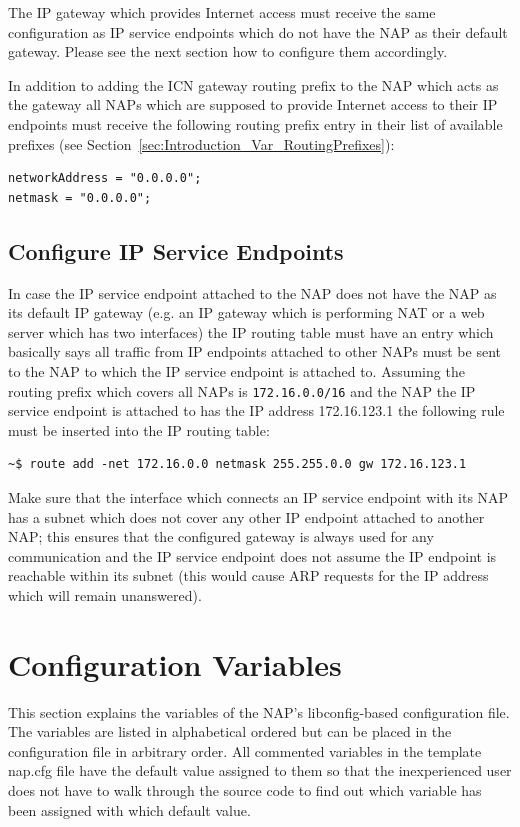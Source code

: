 \documentclass[a4paper,11pt,titlepage]{report}
\begin{document}
The IP gateway which provides Internet access must receive the same configuration as IP service endpoints which do not have the \ac{NAP} as their default gateway. Please see the next section how to configure them accordingly.

In addition to adding the ICN gateway routing prefix to the \ac{NAP} which acts as the gateway all \acp{NAP} which are supposed to provide Internet access to their IP endpoints must receive the following routing prefix entry in their list of available prefixes (see Section~\ref{sec:Introduction_Var_RoutingPrefixes}):

\begin{lstlisting}
networkAddress = "0.0.0.0";
netmask = "0.0.0.0";
\end{lstlisting}

\subsection{Configure IP Service Endpoints}
In case the IP service endpoint attached to the \ac{NAP} does not have the NAP as its default IP gateway (e.g. an IP gateway which is performing NAT or a web server which has two interfaces) the IP routing table must have an entry which basically says all traffic from IP endpoints attached to other \acp{NAP} must be sent to the \ac{NAP} to which the IP service endpoint is attached to. Assuming the routing prefix which covers all \acp{NAP} is \texttt{172.16.0.0/16} and the \ac{NAP} the IP service endpoint is attached to has the IP address 172.16.123.1 the following rule must be inserted into the IP routing table:

\begin{lstlisting}
~$ route add -net 172.16.0.0 netmask 255.255.0.0 gw 172.16.123.1
\end{lstlisting}

Make sure that the interface which connects an IP service endpoint with its \ac{NAP} has a subnet which does not cover any other IP endpoint attached to another \ac{NAP}; this ensures that the configured gateway is always used for any communication and the IP service endpoint does not assume the IP endpoint is reachable within its subnet (this would cause ARP requests for the IP address which will remain unanswered).
\section{Configuration Variables}
This section explains the variables of the \ac{NAP}'s libconfig-based configuration file. The variables are listed in alphabetical ordered but can be placed in the configuration file in arbitrary order. All commented variables in the template nap.cfg file have the default value assigned to them so that the inexperienced user does not have to walk through the source code to find out which variable has been assigned with which default value.
\end{document}
